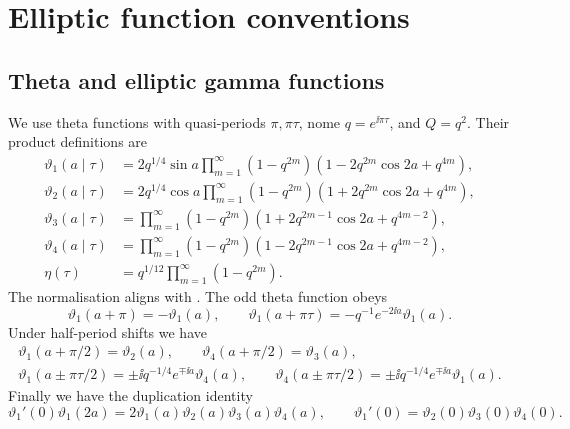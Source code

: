 \section{Elliptic function conventions}
\label{app:elliptic}
\subsection{Theta and elliptic gamma functions}
\label{app:theta-gamma}
We use theta functions with quasi-periods $\pi,\pi\tau$, nome
$q=e^{\ii\pi\tau}$, and $Q=q^2$. Their
product definitions are
\begin{equation}
  \begin{aligned}
    \vartheta_1(a\mid\tau)
    &=2q^{1/4}\sin a\prod_{m=1}^{\infty}
    (1-q^{2m})(1-2q^{2m}\cos2a+q^{4m}),\\
    \vartheta_2(a\mid\tau)
    &=2q^{1/4}\cos a\prod_{m=1}^{\infty}
    (1-q^{2m})(1+2q^{2m}\cos2a+q^{4m}),\\
    \vartheta_3(a\mid\tau)
    &=\prod_{m=1}^{\infty}
    (1-q^{2m})(1+2q^{2m-1}\cos2a+q^{4m-2}),\\
    \vartheta_4(a\mid\tau)
    &=\prod_{m=1}^{\infty}
    (1-q^{2m})(1-2q^{2m-1}\cos2a+q^{4m-2}),\\
    \eta(\tau)&=q^{1/12}\prod_{m=1}^{\infty}(1-q^{2m}).
  \end{aligned}
  \label{eq:theta-products}
\end{equation}
The normalisation aligns with \cite{WhittakerWatson,Lawden,DLMF}. The odd theta
function obeys
\begin{equation}
  \vartheta_1(a+\pi)=-\vartheta_1(a),\qquad
  \vartheta_1(a+\pi\tau)=-q^{-1}e^{-2\ii a}\vartheta_1(a).
  \label{eq:theta-periods}
\end{equation}
Under half-period shifts we have
\begin{equation}
  \begin{gathered}
    \vartheta_1(a+\pi/2)=\vartheta_2(a),\qquad
    \vartheta_4(a+\pi/2)=\vartheta_3(a),\\
    \vartheta_1(a\pm\pi\tau/2)
    =\pm\ii q^{-1/4}e^{\mp\ii a}\vartheta_4(a),\qquad
    \vartheta_4(a\pm\pi\tau/2)
    =\pm\ii q^{-1/4}e^{\mp\ii a}\vartheta_1(a).
  \end{gathered}
  \label{eq:half-periods}
\end{equation}
Finally we have the duplication identity
\begin{equation}
  \vartheta_1'(0)\vartheta_1(2a)
  =2\vartheta_1(a)\vartheta_2(a)\vartheta_3(a)\vartheta_4(a),
  \qquad
  \vartheta_1'(0)=\vartheta_2(0)\vartheta_3(0)\vartheta_4(0).
  \label{eq:theta-duplication}
\end{equation}


